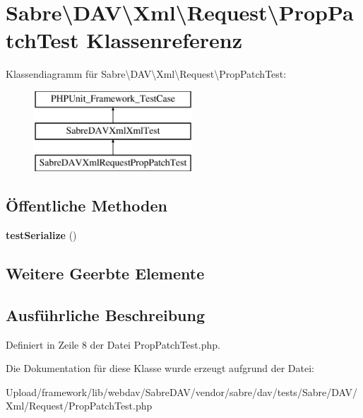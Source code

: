 \hypertarget{class_sabre_1_1_d_a_v_1_1_xml_1_1_request_1_1_prop_patch_test}{}\section{Sabre\textbackslash{}D\+AV\textbackslash{}Xml\textbackslash{}Request\textbackslash{}Prop\+Patch\+Test Klassenreferenz}
\label{class_sabre_1_1_d_a_v_1_1_xml_1_1_request_1_1_prop_patch_test}
Klassendiagramm für Sabre\textbackslash{}D\+AV\textbackslash{}Xml\textbackslash{}Request\textbackslash{}Prop\+Patch\+Test\+:\begin{figure}[H]
\begin{center}
\leavevmode
\includegraphics[height=3.000000cm]{class_sabre_1_1_d_a_v_1_1_xml_1_1_request_1_1_prop_patch_test}
\end{center}
\end{figure}
\subsection*{Öffentliche Methoden}
\begin{DoxyCompactItemize}
\item 
\mbox{\label{class_sabre_1_1_d_a_v_1_1_xml_1_1_request_1_1_prop_patch_test_abd26159ed03de9865cbc989f176a22df}} 
{\bfseries test\+Serialize} ()
\end{DoxyCompactItemize}
\subsection*{Weitere Geerbte Elemente}


\subsection{Ausführliche Beschreibung}


Definiert in Zeile 8 der Datei Prop\+Patch\+Test.\+php.



Die Dokumentation für diese Klasse wurde erzeugt aufgrund der Datei\+:\begin{DoxyCompactItemize}
\item 
Upload/framework/lib/webdav/\+Sabre\+D\+A\+V/vendor/sabre/dav/tests/\+Sabre/\+D\+A\+V/\+Xml/\+Request/Prop\+Patch\+Test.\+php\end{DoxyCompactItemize}
